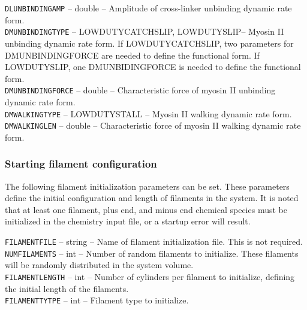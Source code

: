 \documentclass[11pt, oneside]{article}   	%
\begin{document}
   \noindent\texttt{DLUNBINDINGAMP} -- double -- Amplitude of cross-linker unbinding dynamic rate form. \\
   
   \noindent\texttt{DMUNBINDINGTYPE} -- LOWDUTYCATCHSLIP, LOWDUTYSLIP-- Myosin II unbinding dynamic rate form.
  If LOWDUTYCATCHSLIP, two
  parameters for DMUNBINDINGFORCE are needed to define the functional form. 
  If LOWDUTYSLIP, one 
  DMUNBIDINGFORCE is needed to define the functional form. \\
   
   \noindent\texttt{DMUNBINDINGFORCE} -- double -- Characteristic force of myosin II unbinding dynamic rate form. \\
   
   \noindent\texttt{DMWALKINGTYPE} -- LOWDUTYSTALL -- Myosin II walking dynamic rate form. \\ 
   
   \noindent\texttt{DMWALKINGLEN} -- double -- Characteristic force of myosin II walking dynamic rate form. \\
   
 
\normalsize

\subsubsection{Starting filament configuration}

The following filament initialization parameters can be set. These parameters define the initial configuration and length
of filaments in the system. It is noted that at least one filament, plus end, and minus end chemical species must be initialized in the chemistry input file, or a startup error will result.\\

\small

  \noindent\texttt{FILAMENTFILE} -- string -- Name of filament initialization file. This is not required.\\

  \noindent\texttt{NUMFILAMENTS} -- int -- Number of random filaments to initialize. These filaments will be randomly 
  distributed in the system volume.\\

  \noindent\texttt{FILAMENTLENGTH} -- int -- Number of cylinders per filament to initialize, defining the initial length of the filaments.\\
  
   \noindent\texttt{FILAMENTTYTPE} -- int -- Filament type to initialize.\\
\end{document}
